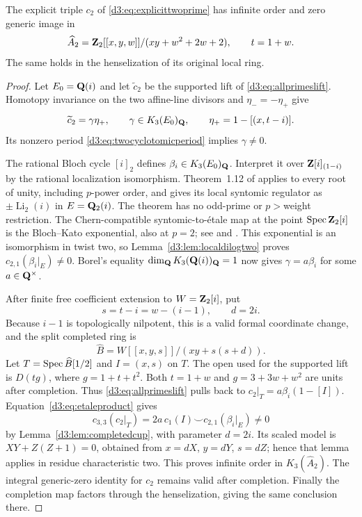 \begin{proposition}\label{d3:prop:explicittwocomplete}
The explicit triple $c_2$ of \eqref{d3:eq:explicittwoprime} has
infinite order and zero generic image in
\[
 \widehat A_2
 =\mathbf Z_2[[x,y,w]]/(xy+w^2+2w+2),\qquad t=1+w.
\]
The same holds in the henselization of its original local ring.
\end{proposition}
\begin{proof}
Let $E_0=\mathbf Q(i)$ and let $\widetilde c_2$ be the supported lift
of \eqref{d3:eq:allprimeslift}. Homotopy invariance on the two
affine-line divisors and $\eta_-=-\eta_+$ give
\[
 \widetilde c_2=\gamma\eta_+,\qquad
 \gamma\in K_3(E_0)_{\mathbf Q},\qquad
 \eta_+=1-[(x,t-i)].
\]
Its nonzero period \eqref{d3:eq:twocyclotomicperiod} implies
$\gamma\ne0$.

The rational Bloch cycle $[i]_2$ defines
$\beta_i\in K_3(E_0)_{\mathbf Q}$. Interpret it over
$\mathbf Z[i]_{(1-i)}$ by the rational localization isomorphism.
Theorem~1.12 of \cite{BesserDeJeu} applies to every root of unity,
including $p$-power order, and gives its local syntomic regulator
as $\pm\operatorname{Li}_2(i)$ in $E=\mathbf Q_2(i)$.
The theorem has no odd-prime or $p>$weight restriction.
The Chern-compatible syntomic-to-\'etale map at the point
$\operatorname{Spec}\mathbf Z_2[i]$ is the Bloch--Kato exponential, also at $p=2$;
see \cite[Example~2.2.4 and Propositions~2.2.7, 2.3.4]{HuberKings}
and \cite[Corollary~5.19 and its proof]{Tamme}.
This exponential is an isomorphism in twist two, so
Lemma~\ref{d3:lem:localdilogtwo} proves
$c_{2,1}(\beta_i|_E)\ne0$.
Borel's equality $\dim_{\mathbf Q}K_3(\mathbf Q(i))_{\mathbf Q}=1$
\cite[Proposition~12.2]{Borel} now gives
$\gamma=a\beta_i$ for some $a\in\mathbf Q^\times$.

After finite free coefficient extension to $W=\mathbf Z_2[i]$, put
\[
 s=t-i=w-(i-1),\qquad d=2i.
\]
Because $i-1$ is topologically nilpotent, this is a valid formal
coordinate change, and the split completed ring is
\[
 \widehat B=W[[x,y,s]]/(xy+s(s+d)).
\]
Let $T=\operatorname{Spec}\widehat B[1/2]$ and $I=(x,s)$ on $T$.
The open used for the supported lift is $D(tg)$,
where $g=1+t+t^2$. Both $t=1+w$ and
$g=3+3w+w^2$ are units after completion. Thus
\eqref{d3:eq:allprimeslift} pulls back to
$c_2|_T=a\beta_i(1-[I])$.
Equation~\eqref{d3:eq:etaleproduct} gives
\[
 c_{3,3}(c_2|_T)
 =2a\,c_1(I)\smile c_{2,1}(\beta_i|_E)\ne0
\]
by Lemma~\ref{d3:lem:completedcup}, with parameter $d=2i$.
Its scaled model is $XY+Z(Z+1)=0$, obtained from
$x=dX$, $y=dY$, $s=dZ$; hence that lemma applies in residue
characteristic two.
This proves infinite order in $K_3(\widehat A_2)$.
The integral generic-zero identity for $c_2$ remains valid after
completion. Finally the completion map factors through the
henselization, giving the same conclusion there.
\end{proof}


